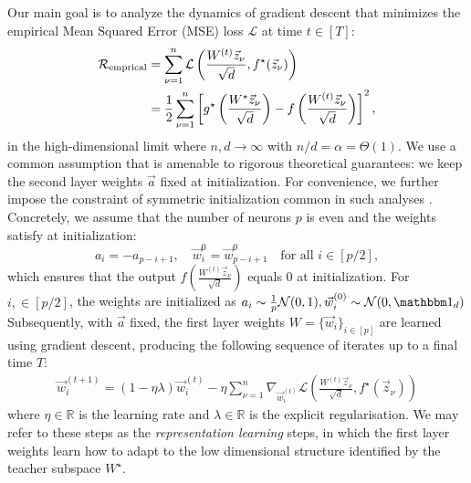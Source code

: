 Our main goal is to analyze the dynamics of gradient descent that minimizes the empirical Mean Squared Error (MSE) loss $\mathcal{L}$ at time $t \in [T]$:
\begin{align}
  {\cal R}_{\rm emprical} &=\sum_{\nu=1}^n\mathcal{L}\left(\frac{W^{(t)}\vec z_\nu} {\sqrt{d}},f^\star(\vec z_\nu)\right) \\
  &= \frac{1}{2} \sum_{\nu=1}^{n}\left[g^\star\left(\frac{W^\star \vec z_\nu}{\sqrt{d}}\right) - f\left( \frac{W^{(t)}\vec z_\nu} {\sqrt{d}}\right)\right]^2 , \nonumber 
\end{align}
in the high-dimensional limit where $n,d  \to  \infty$ with $n/d  =  \alpha  =  \Theta(1)$. We use a common assumption that is amenable to rigorous theoretical guarantees: we keep the second layer weights $\vec a$ fixed at initialization. 
For convenience, we further impose the constraint of symmetric initialization common in such analyses \citep{dandi2023how,damian2022neural}. Concretely, we assume that the number of neurons $p$ is even and the weights satisfy at initialization:
\begin{equation}\label{2402:eq:init_sym}
    a_i = -a_{p-i+1}, \quad \vec{w}_i^0 = \vec{w}_{p-i+1}^0 \quad \text{for all } i \in [p/2],
\end{equation}
which ensures that the output $f\left( \frac{W^{(t)}\vec z_\nu} {\sqrt{d}}\right)$ equals $0$ at initialization.
For $i, \in [p/2]$, the weights are initialized as $a_i \sim \frac{1}{p}\mathcal{N}(0,1), \vec w_i^{(0)}  \sim   \mathcal{N}(0,{\mathbbm 1}_d)$
Subsequently, with $\vec{a}$ fixed, the first layer weights $W=\{\vec w_i\}_{i \in [p]}$ are learned using gradient descent, producing the following sequence of iterates up to a final time $T$:
\begin{align} 
    \label{2402:eq:GD_update}
    \vec w_i^{( t+1 )} = (1 - \eta\lambda)\vec w^{( t )}_i  -  \eta  \sum_{\nu=1}^n \nabla_{  \vec w^{( t )}_i}
    \mathcal{L} \left( \frac{W^{(t)}\vec z_\nu} {\sqrt{d}},f^\star(\vec z_\nu)  \right)
\end{align}
where $\eta \in \mathbb{R}$ is the learning rate and $\lambda \in \mathbb{R}$ is the explicit regularisation. We may refer to these steps as the \textit{representation learning} steps, in which the first layer weights learn how to adapt to the low dimensional structure identified by the teacher subspace $W^\star$.  

